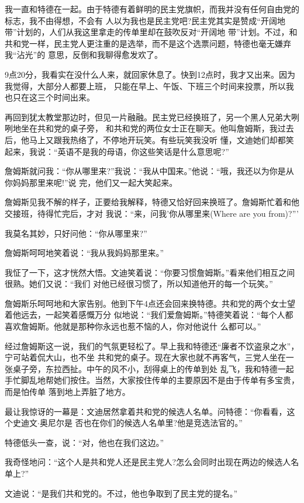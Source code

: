 ﻿\documentclass[11pt]{article}
\begin{document}
我一直和特德在一起。由于特德有着鲜明的民主党旗帜，而我并没有任何自由党的标志，我不由得想，不会有
人以为我也是民主党吧?民主党其实是赞成``开阔地带''计划的，人们从我这里拿走的传单里却在鼓吹反对``开阔地
带''计划。不过，和共和党一样，民主党人更注重的是选举，而不是这个选票问题，特德也毫无嫌弃我``沾光''的
意思，反倒和我聊得愈发欢了。

9点20分，我看实在没什么人来，就回家休息了。快到12点时，我才又出来。因为我觉得，大部分人都要上班，
只能在早上、午饭、下班三个时间来投票，所以我也只在这三个时间出来。

再回到犹太教堂那边时，但见一片融融。民主党已经换班了，另一个黑人兄弟大咧咧地坐在共和党的桌子旁，
和共和党的两位女士正在聊天。他叫詹姆斯，我过去后，他马上又跟我热络了，不停地开玩笑。有些玩笑我没听
懂，文迪她们却都笑起来，我说：``英语不是我的母语，你这些笑话是什么意思呢?''

詹姆斯就问我：``你从哪里来?''我说：``我从中国来。''他说：``哦，我还以为你是从你妈妈那里来呢!''说
完，他们又一起大笑起来。

詹姆斯见我不解的样子，正要给我解释，特德又恰好回来换班了。詹姆斯忙着和他交接班，待得忙完后，才对
我说：``来，问我'你从哪里来(Where are you from)?'''

我莫名其妙，只好问他：``你从哪里来?''

詹姆斯呵呵地笑着说：``我从我妈妈那里来。''

我怔了一下，这才恍然大悟。文迪笑着说：``你要习惯詹姆斯。''看来他们相互之间很熟。她们又说：``我们
对他已经很习惯了，所以知道他开的每一个玩笑。''

詹姆斯乐呵呵地和大家告别。他到下午4点还会回来换特德。共和党的两个女士望着他远去，一起笑着感慨万分
似地说：``我们爱詹姆斯。''特德笑着说：``每个人都喜欢詹姆斯。他就是那种你永远也惹不恼的人，你对他说什
么都可以。''

经过詹姆斯这一说，我们的气氛更轻松了。早上我和特德还``廉者不饮盗泉之水''，宁可站着侃大山，也不坐
共和党的桌子。现在大家也就不再客气，三党人坐在一张桌子旁，东拉西扯。中午的风不小，刮得桌上的传单到处
乱飞，我和特德一起手忙脚乱地帮她们按住。当然，大家按住传单的主要原因不是由于传单有多宝贵，而是怕传单
落到地上弄脏了地方。

最让我惊讶的一幕是：文迪居然拿着共和党的候选人名单。问特德：``你看看，这个史迪文$\cdot$奥尼尔是
否也在你们的候选人名单里?他是竞选法官的。''

特德低头一查，说：``对，他也在我们这边。''

我奇怪地问：``这个人是共和党人还是民主党人?怎么会同时出现在两边的候选人名单上?''

文迪说：``是我们共和党的。不过，他也争取到了民主党的提名。''
\end{document}
